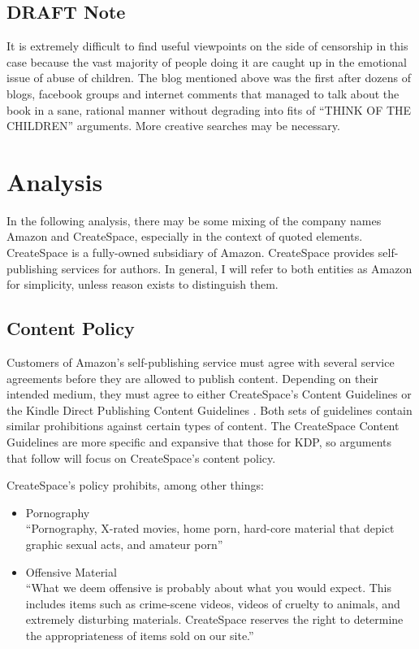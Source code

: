 \documentclass[11pt]{article}
\begin{document}
\begin{multicols}{2}
\subsection{DRAFT Note}
It is extremely difficult to find useful viewpoints on the side of censorship in this case because the vast majority of people doing it are caught up in the emotional issue of abuse of children.  The blog mentioned above was the first after dozens of blogs, facebook groups and internet comments that managed to talk about the book in a sane, rational manner without degrading into fits of ``THINK OF THE CHILDREN'' arguments. More creative searches may be necessary.


\section{Analysis}
In the following analysis, there may be some mixing of the company names Amazon and CreateSpace, especially in the context of quoted elements.  CreateSpace is a fully-owned subsidiary of Amazon.  CreateSpace provides self-publishing services for authors.  In general, I will refer to both entities as Amazon for simplicity, unless reason exists to distinguish them.

\subsection{Content Policy}

Customers of Amazon's self-publishing service must agree with several service agreements before they are allowed to publish content.  Depending on their intended medium, they must agree to either CreateSpace's Content Guidelines \cite{CreateSpaceContentGuidelines} or the Kindle Direct Publishing Content Guidelines \cite{AmazonKDPContentGuidelines}.  Both sets of guidelines contain similar prohibitions against certain types of content.  The CreateSpace Content Guidelines are more specific and expansive that those for KDP, so arguments that follow will focus on CreateSpace's content policy.

CreateSpace's policy prohibits, among other things:

\begin{itemize}
\item Pornography \hfill \\
      ``Pornography, X-rated movies, home porn, hard-core material that depict graphic sexual acts, and amateur porn''
\item Offensive Material \hfill \\
      ``What we deem offensive is probably about what you would expect. This includes items such as crime-scene videos, videos of cruelty to animals, and extremely disturbing materials. CreateSpace reserves the right to determine the appropriateness of items sold on our site.''


\end{itemize}
\end{multicols}
\end{document}
